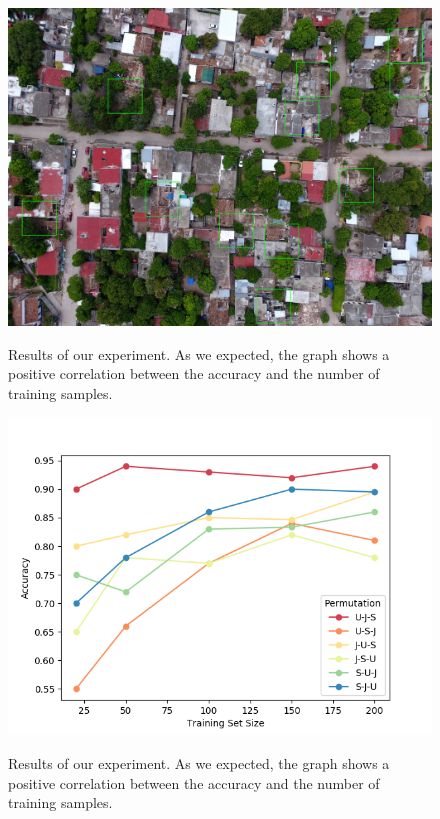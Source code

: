 \begin{figure}[h]
  \centering
  \includegraphics[width=\textwidth]{images/no-overlap.jpg}
  \label{fig:no-overlap}
  \caption{Results of our experiment. As we expected, the graph shows a positive correlation between the accuracy and the number of training samples.}
\end{figure}


\begin{figure}[h]
  \centering
  \includegraphics[width=1\textwidth]{images/validation-plot.png}
  \label{fig:validaton-plot}
  \caption{Results of our experiment. As we expected, the graph shows a positive correlation between the accuracy and the number of training samples.}
\end{figure}




